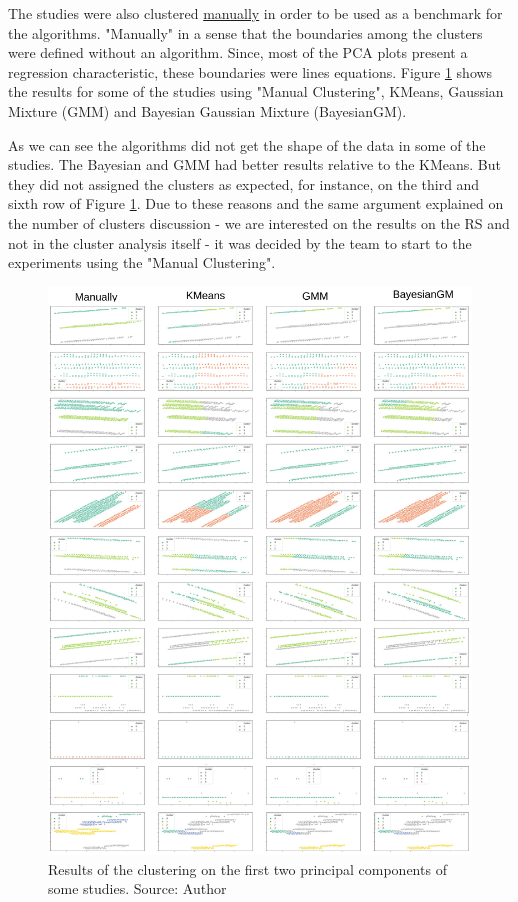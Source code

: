 The studies were also clustered \underline{manually} in order to be used as a benchmark for the algorithms. "Manually" in a sense that the boundaries among the clusters were defined without an algorithm. Since, most of the PCA plots present a regression characteristic, these boundaries were lines equations. Figure \ref{fig:clustering-studies} shows the results for some of the studies using "Manual Clustering", KMeans, Gaussian Mixture (GMM) and Bayesian Gaussian Mixture (BayesianGM).

As we can see the algorithms did not get the shape of the data in some of the studies. The Bayesian and GMM had better results relative to the KMeans. But they did not assigned the clusters as expected, for instance, on the third and sixth row of Figure \ref{fig:clustering-studies}. Due to these reasons and the same argument explained on the number of clusters discussion - we are interested on the results on the RS and not in the cluster analysis itself - it was decided by the team to start to the experiments using the "Manual Clustering".

\begin{figure}[H]
   \centering
   \includegraphics[width=\linewidth]{fig/ch3-clustering-studies.png}
   \caption{Results of the clustering on the first two principal components of some studies. Source: Author}
   \label{fig:clustering-studies}
\end{figure}

